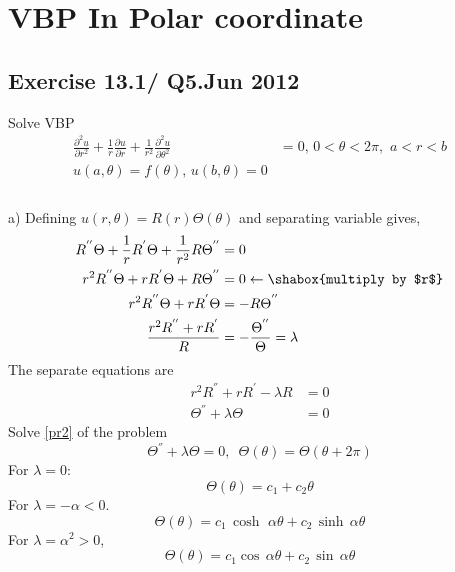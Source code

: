 \chapter{VBP In Polar coordinate}
\section{Exercise 13.1/ Q5.Jun 2012}
\begin{prob}
\end{prob}
Solve VBP
\begin{align*}
\frac{\partial^2u}{\partial r^2}+\frac{1}{r}\frac{\partial u}{\partial r}+\frac{1}{r^2}\frac{\partial^2 u}{\partial\theta^2}&=0,\,0<\theta<2\pi,\,\,a<r<b\\
u(a,\theta)=f(\theta),\,u(b,\theta)=0\\
\end{align*}
\\
a) Defining $u(r,\theta)=R(r)\Theta(\theta)$ and separating variable gives,
\begin{align*}
R^{''}\Theta+\frac{1}{r}R^{'}\Theta+\frac{1}{r^2}R\Theta^{''}&=0\\
r^2R^{''}\Theta+rR^{'}\Theta+R\Theta^{''}&=0\leftarrow\shabox{multiply by $r$}\\
r^2R^{''}\Theta+rR^{'}\Theta&=-R\Theta^{''}\\
\frac{r^2R^{''}+rR^{'}}{R}&=-\frac{\Theta^{''}}{\Theta}=\lambda
\end{align*}
The separate equations are
\begin{align}
r^2R^{''}+rR^{'}-\lambda R&=0\label{pr1}\\
\Theta^{''}+\lambda\Theta&=0\label{pr2}
\end{align}
Solve \eqref{pr2} of the problem
\begin{equation}
\Theta^{''}+\lambda\Theta=0,\,\,\, \Theta(\theta)=\Theta(\theta+2\pi)
\end{equation}\label{pr2a}
For $\lambda=0$:
\begin{equation}
\Theta(\theta)=c_1+c_2\theta\label{pr3}
\end{equation}
For $\lambda=-\alpha<0$.
\begin{equation}
\Theta(\theta)=c_1\,\cosh\,\,\alpha \theta+c_2\,\sinh\,\alpha\theta\label{pr4}
\end{equation}
For $\lambda=\alpha^2>0$,
\begin{equation}
\Theta(\theta)=c_1\cos\,\alpha\theta+c_2\,\sin\,\alpha\theta\label{pr5}
\end{equation}
